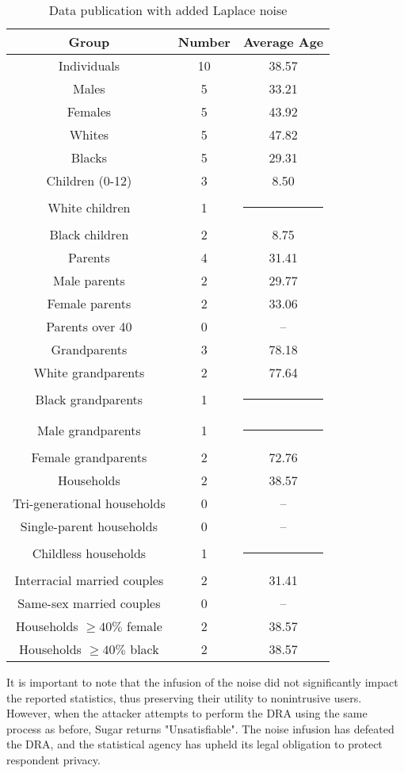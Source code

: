 \documentclass[runningheads]{llncs}
\begin{document}
\begin{table}[t]
\begin{tabular}{c|c|c}
Group & Number & Average Age \\
\hline
Individuals & 10 & 38.57 \\
Males & 5 & 33.21 \\
Females & 5 & 43.92 \\
Whites & 5 & 47.82 \\
Blacks & 5 & 29.31 \\
\hline
Children (0-12) & 3 & 8.50 \\
White children & 1 & \multicolumn{1}{c}{\rule{6mm}{3mm}} \\
Black children & 2 & 8.75 \\
\hline
Parents & 4 & 31.41 \\
Male parents & 2 & 29.77 \\
Female parents & 2 & 33.06 \\
Parents over 40 & 0 & -- \\
\hline
Grandparents & 3 & 78.18 \\
White grandparents & 2 & 77.64 \\
Black grandparents & 1 & \multicolumn{1}{c}{\rule{6mm}{3mm}} \\
Male grandparents & 1 & \multicolumn{1}{c}{\rule{6mm}{3mm}} \\
Female grandparents & 2 & 72.76 \\
\hline
Households & 2 & 38.57 \\
Tri-generational households & 0 & -- \\
Single-parent households & 0 & -- \\
Childless households & 1 & \multicolumn{1}{c}{\rule{6mm}{3mm}} \\
Interracial married couples & 2 & 31.41 \\
Same-sex married couples & 0 & -- \\
Households $\geq 40\% $ female & 2 & 38.57 \\
Households $\geq 40\% $ black & 2 & 38.57 \\

\hline
\end{tabular}
\caption{Data publication with added Laplace noise}\label{publishedstatsnoise}
\end{table}
It is important to note that the infusion of the noise did not significantly impact the reported statistics, thus preserving their utility to nonintrusive users. However, when the attacker attempts to perform the DRA using the same process as before, Sugar returns "Unsatisfiable". The noise infusion has defeated the DRA, and the statistical agency has upheld its legal obligation to protect respondent privacy.
\end{document}

